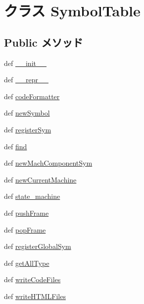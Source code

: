 \hypertarget{classslicc_1_1symbols_1_1SymbolTable_1_1SymbolTable}{
\section{クラス SymbolTable}
\label{classslicc_1_1symbols_1_1SymbolTable_1_1SymbolTable}
}
\subsection*{Public メソッド}
\begin{DoxyCompactItemize}
\item 
def \hyperlink{classslicc_1_1symbols_1_1SymbolTable_1_1SymbolTable_ac775ee34451fdfa742b318538164070e}{\_\-\_\-init\_\-\_\-}
\item 
def \hyperlink{classslicc_1_1symbols_1_1SymbolTable_1_1SymbolTable_ad8b9328939df072e4740cd9a63189744}{\_\-\_\-repr\_\-\_\-}
\item 
def \hyperlink{classslicc_1_1symbols_1_1SymbolTable_1_1SymbolTable_a68362f78121a5495eaa849608e1bed7a}{codeFormatter}
\item 
def \hyperlink{classslicc_1_1symbols_1_1SymbolTable_1_1SymbolTable_a256b30ec3ed95726130ecbcfe94ab26a}{newSymbol}
\item 
def \hyperlink{classslicc_1_1symbols_1_1SymbolTable_1_1SymbolTable_af211eebadbc4507ebf53588ae11675c7}{registerSym}
\item 
def \hyperlink{classslicc_1_1symbols_1_1SymbolTable_1_1SymbolTable_a01f90f57b7acd55e177611f5d0f7df23}{find}
\item 
def \hyperlink{classslicc_1_1symbols_1_1SymbolTable_1_1SymbolTable_af72d1c1bd8f92a5eb722eba7835c5b49}{newMachComponentSym}
\item 
def \hyperlink{classslicc_1_1symbols_1_1SymbolTable_1_1SymbolTable_a4bd012ae0d4d6660f4318e968d61ca05}{newCurrentMachine}
\item 
def \hyperlink{classslicc_1_1symbols_1_1SymbolTable_1_1SymbolTable_ac4db0fc2cd33768643738f7f9d8bec5e}{state\_\-machine}
\item 
def \hyperlink{classslicc_1_1symbols_1_1SymbolTable_1_1SymbolTable_a7dfb59f66a6fd28386285ed4c3d94e08}{pushFrame}
\item 
def \hyperlink{classslicc_1_1symbols_1_1SymbolTable_1_1SymbolTable_a9483e85950d1ea03dfc063962c08a1b9}{popFrame}
\item 
def \hyperlink{classslicc_1_1symbols_1_1SymbolTable_1_1SymbolTable_a7a7ed8c9108ff97ac8aa23711672544d}{registerGlobalSym}
\item 
def \hyperlink{classslicc_1_1symbols_1_1SymbolTable_1_1SymbolTable_a500fe67d455c73b37149cd61c46a4752}{getAllType}
\item 
def \hyperlink{classslicc_1_1symbols_1_1SymbolTable_1_1SymbolTable_a69d0582bde832d4ff45237ab5ff116bb}{writeCodeFiles}
\item 
def \hyperlink{classslicc_1_1symbols_1_1SymbolTable_1_1SymbolTable_abc09a7197df5d7ef04e5cdfaa1139ead}{writeHTMLFiles}
\end{DoxyCompactItemize}
